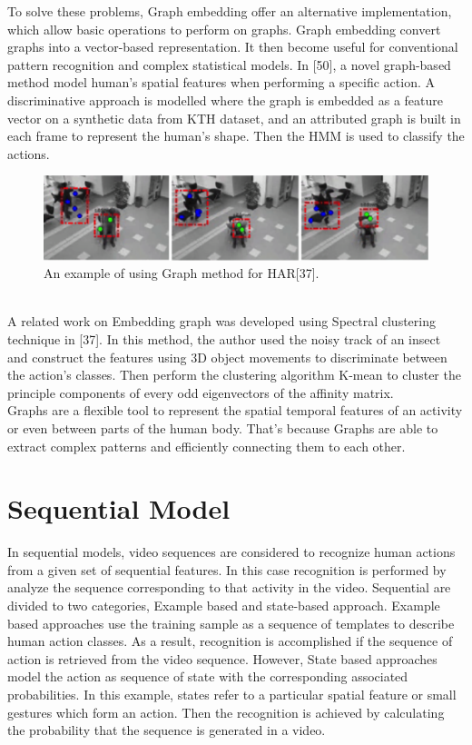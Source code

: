To solve these problems, Graph embedding offer an alternative implementation, which allow basic operations to perform on graphs. Graph embedding convert graphs into a vector-based representation. It then become useful for conventional pattern recognition and complex statistical models. In [50], a novel graph-based method model human’s spatial features when performing a specific action. A discriminative approach is modelled where the graph is embedded as a feature vector on a synthetic data from KTH dataset, and an attributed graph is built in each frame to represent the human’s shape. Then the HMM is used to classify the actions.
\begin{figure}[ht]
\centering
\includegraphics{Figures/gr1}
\decoRule
\caption[An example of using Graph method for HAR "37"]{An example of using Graph method for HAR[37].}
\label{fig:la}
\end{figure}\hfill \\

A related work on Embedding graph was developed using Spectral clustering technique in [37]. In this method, the author used the noisy track of an insect and construct the features using 3D object movements to discriminate between the action’s classes. Then perform the clustering algorithm K-mean to cluster the principle components of every odd eigenvectors of the affinity matrix.\\

Graphs are a flexible tool to represent the spatial temporal features of an activity or even between parts of the human body. That’s because Graphs are able to extract complex patterns and efficiently connecting them to each other. 
\section{Sequential Model}
\hspace{5mm} In sequential models, video sequences are considered to recognize human actions from a given set of sequential features. In this case recognition is performed by analyze the sequence corresponding to that activity in the video. Sequential are divided to two categories, Example based and state-based approach. Example based approaches use the training sample as a sequence of templates to describe human action classes. As a result, recognition is accomplished if the sequence of action is retrieved from the video sequence. However, State based approaches model the action as sequence of state with the corresponding associated probabilities. In this example, states refer to a particular spatial feature or small gestures which form an action. Then the recognition is achieved by calculating the probability that the sequence is generated in a video.

